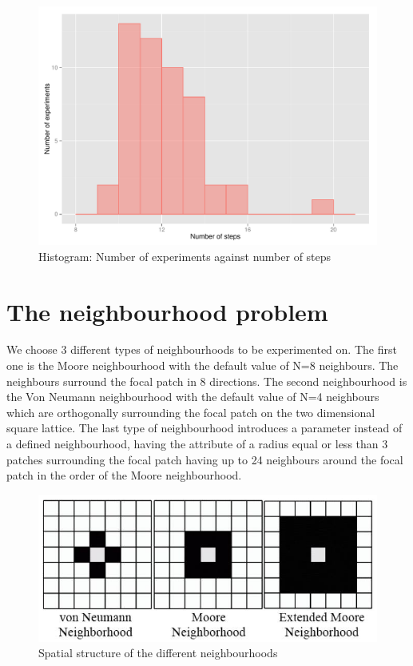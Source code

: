 \documentclass[DIV=calc, paper=a4, fontsize=11pt, twocolumn]{scrartcl}	 %
\begin{document}
\begin{figure}[here]
\centering
\begin{minipage}{.48\textwidth}
  \centering
  \includegraphics[width=1\linewidth]{task1numberofexstep}
 \caption{Histogram: Number of experiments against number of steps}
\label{fig:histo}
\end{minipage}%
\end{figure}


\section*{The neighbourhood problem}

We choose 3 different types of neighbourhoods to be experimented on. The first one is the Moore neighbourhood with the default value of N=8 neighbours. The neighbours surround the focal patch in 8 directions. The second neighbourhood is the Von Neumann neighbourhood with the default value of N=4 neighbours which are orthogonally surrounding the focal patch on the two dimensional square lattice. The last type of neighbourhood introduces a parameter instead of a defined neighbourhood, having the attribute of a radius equal or less than 3 patches surrounding the focal patch having up to 24 neighbours around the focal patch in the order of the Moore neighbourhood. \\

\begin{figure}[here]
\centering
\begin{minipage}{.48\textwidth}
  \centering
  \includegraphics[width=1\linewidth]{neighbors}
 \caption{Spatial structure of the different neighbourhoods}
\label{fig:histo}
\end{minipage}%
\end{figure}
\end{document}
